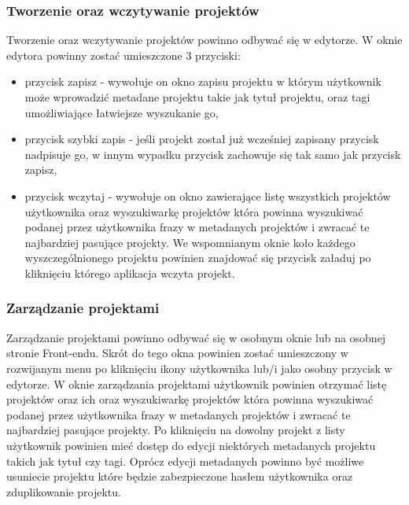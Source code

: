 \documentclass{article}
\begin{document}
\subsubsection{Tworzenie oraz wczytywanie projektów}

Tworzenie oraz wczytywanie projektów powinno odbywać się w edytorze. W oknie edytora powinny zostać umieszczone 3 przyciski:
\begin{itemize}
    \item przycisk zapisz - wywołuje on okno zapisu projektu w którym użytkownik może wprowadzić metadane projektu takie jak tytuł projektu, oraz tagi umożliwiające łatwiejsze wyszukanie go,
    \item przycisk szybki zapis - jeśli projekt został już wcześniej zapisany przycisk nadpisuje go, w innym wypadku przycisk zachowuje się tak samo jak przycisk zapisz,
    \item przycisk wczytaj - wywołuje on okno zawierające listę wszystkich projektów użytkownika oraz wyszukiwarkę projektów która powinna wyszukiwać podanej przez użytkownika frazy w metadanych projektów i zwracać te najbardziej pasujące projekty. We wspomnianym oknie koło każdego wyszczególnionego projektu powinien znajdować się przycisk załaduj po kliknięciu którego aplikacja wczyta projekt.
\end{itemize}

\subsubsection{Zarządzanie projektami}

Zarządzanie projektami powinno odbywać się w osobnym oknie lub na osobnej stronie Front-endu. Skrót do tego okna powinien zostać umieszczony w rozwijanym menu po kliknięciu ikony użytkownika lub/i jako osobny przycisk w edytorze. W oknie zarządzania projektami użytkownik powinien otrzymać listę projektów oraz ich oraz wyszukiwarkę projektów która powinna wyszukiwać podanej przez użytkownika frazy w metadanych projektów i zwracać te najbardziej pasujące projekty. Po kliknięciu na dowolny projekt z listy użytkownik powinien mieć dostęp do edycji niektórych metadanych projektu takich jak tytuł czy tagi. Oprócz edycji metadanych powinno być możliwe usuniecie projektu które będzie zabezpieczone hasłem użytkownika oraz zduplikowanie projektu.
\end{document}
